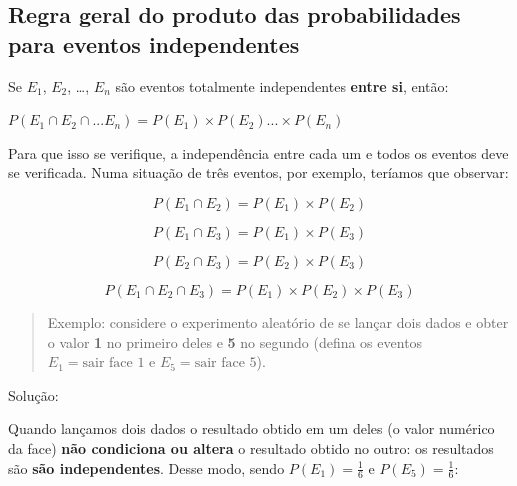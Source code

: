 \documentclass[
]{book}
\begin{document}
\hfill\break

\hypertarget{regra-geral-do-produto-das-probabilidades-para-eventos-independentes}{%
\subsection{Regra geral do produto das probabilidades para eventos independentes}\label{regra-geral-do-produto-das-probabilidades-para-eventos-independentes}}

Se \(E_{1}\), \(E_{2}\), \ldots, \(E_{n}\) são eventos totalmente independentes \textbf{entre si}, então:

\hfill\break

\begin{center}
$P (E_{1} \cap E_{2} \cap ... E_{n})= P(E_{1}) \times P(E_{2}) ... \times P(E_{n})$
\end{center}

\hfill\break

Para que isso se verifique, a independência entre cada um e todos os eventos deve se verificada. Numa situação de três eventos, por exemplo, teríamos que observar:

\hfill\break

\[
P (E_{1} \cap E_{2})= P(E_{1}) \times P(E_{2})
\]

\hfill\break

\[
P (E_{1} \cap E_{3})= P(E_{1}) \times P(E_{3})
\]

\hfill\break

\[
P (E_{2} \cap E_{3})= P(E_{2}) \times P(E_{3})
\]

\hfill\break

\[
P (E_{1} \cap E_{2} \cap E_{3} )= P(E_{1}) \times P(E_{2}) \times P(E_{3})
\]

\hfill\break

\begin{quote}
Exemplo: considere o experimento aleatório de se lançar dois dados e obter o valor \textbf{1} no primeiro deles e \textbf{5} no segundo (defina os eventos \(E_{1}= \text{sair face 1}\) e \(E_{5}=\text{sair face 5}\)).
\end{quote}

\hfill\break

Solução:

\hfill\break

Quando lançamos dois dados o resultado obtido em um deles (o valor numérico da face) \textbf{não condiciona ou altera} o resultado obtido no outro: os resultados são \textbf{são independentes}. Desse modo, sendo \(P(E_{1})=\frac{1}{6}\) e \(P(E_{5})=\frac{1}{6}\):
\end{document}
